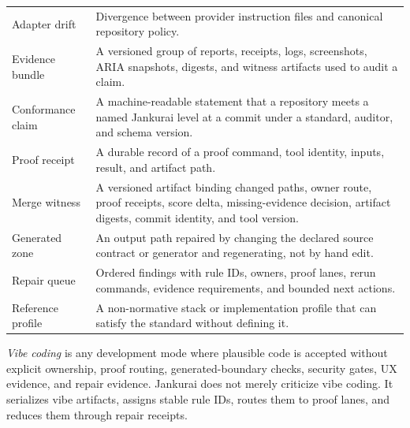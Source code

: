 \begin{table}[t]
\begin{tabularx}{\textwidth}{L{0.20\textwidth} Y}
Adapter drift & Divergence between provider instruction files and canonical repository policy. \\
Evidence bundle & A versioned group of reports, receipts, logs, screenshots, ARIA snapshots, digests, and witness artifacts used to audit a claim. \\
Conformance claim & A machine-readable statement that a repository meets a named Jankurai level at a commit under a standard, auditor, and schema version. \\
Proof receipt & A durable record of a proof command, tool identity, inputs, result, and artifact path. \\
Merge witness & A versioned artifact binding changed paths, owner route, proof receipts, score delta, missing-evidence decision, artifact digests, commit identity, and tool version. \\
Generated zone & An output path repaired by changing the declared source contract or generator and regenerating, not by hand edit. \\
Repair queue & Ordered findings with rule IDs, owners, proof lanes, rerun commands, evidence requirements, and bounded next actions. \\
Reference profile & A non-normative stack or implementation profile that can satisfy the standard without defining it. \\
\bottomrule
\end{tabularx}
\end{table}

\emph{Vibe coding} is any development mode where plausible code is accepted without explicit ownership, proof routing, generated-boundary checks, security gates, UX evidence, and repair evidence. Jankurai does not merely criticize vibe coding. It serializes vibe artifacts, assigns stable rule IDs, routes them to proof lanes, and reduces them through repair receipts.


